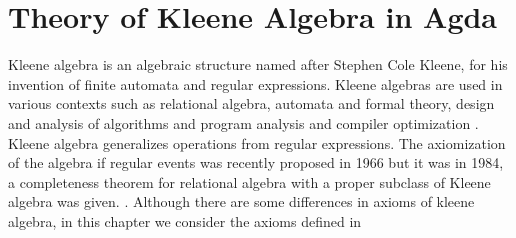 \chapter{Theory of Kleene Algebra in Agda}
Kleene algebra is an algebraic structure named after Stephen Cole Kleene, for his invention of finite automata and regular expressions. Kleene algebras are used in various contexts such as relational algebra, automata and formal theory, design and analysis of algorithms and program analysis and compiler optimization \cite{kozen1997kleene}. Kleene algebra generalizes operations from regular expressions. The axiomization of the algebra if regular events was recently proposed in 1966 but it was in 1984, a completeness theorem for relational algebra with a proper subclass of Kleene algebra was given. \cite{kozen1994completeness}. Although there are some differences in axioms of kleene algebra, in this chapter we consider the axioms defined in \cite{kozen1994completeness}


